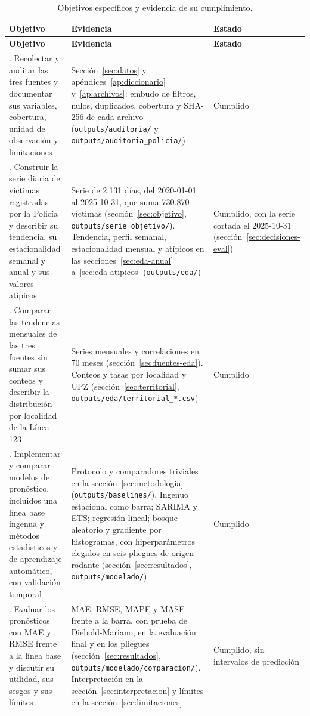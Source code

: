{\small
\setlength{\tabcolsep}{4pt}
\begin{longtable}{@{}>{\raggedright\arraybackslash}p{4.6cm}>{\raggedright\arraybackslash}p{7.6cm}>{\raggedright\arraybackslash}p{2.6cm}@{}}
\caption{Objetivos específicos y evidencia de su cumplimiento.}\label{tab:objetivos}\\
\toprule
\textbf{Objetivo} & \textbf{Evidencia} & \textbf{Estado} \\
\midrule
\endfirsthead
\toprule
\textbf{Objetivo} & \textbf{Evidencia} & \textbf{Estado} \\
\midrule
\endhead
\bottomrule
\endfoot
1. Recolectar y auditar las tres fuentes y documentar sus variables, cobertura, unidad de observación y limitaciones & Sección~\ref{sec:datos} y apéndices~\ref{ap:diccionario} y~\ref{ap:archivos}: embudo de filtros, nulos, duplicados, cobertura y SHA-256 de cada archivo (\texttt{outputs/\allowbreak{}auditoria/} y \texttt{outputs/\allowbreak{}auditoria\_\allowbreak{}policia/}) & Cumplido \\
\addlinespace
2. Construir la serie diaria de víctimas registradas por la Policía y describir su tendencia, su estacionalidad semanal y anual y sus valores atípicos & Serie de 2.131 días, del 2020-01-01 al 2025-10-31, que suma 730.870 víctimas (sección~\ref{sec:objetivo}, \texttt{outputs/\allowbreak{}serie\_\allowbreak{}objetivo/}). Tendencia, perfil semanal, estacionalidad mensual y atípicos en las secciones~\ref{sec:eda-anual} a~\ref{sec:eda-atipicos} (\texttt{outputs/eda/}) & Cumplido, con la serie cortada el 2025-10-31 (sección~\ref{sec:decisiones-eval}) \\
\addlinespace
3. Comparar las tendencias mensuales de las tres fuentes sin sumar sus conteos y describir la distribución por localidad de la Línea 123 & Series mensuales y correlaciones en 70 meses (sección~\ref{sec:fuentes-eda}). Conteos y tasas por localidad y UPZ (sección~\ref{sec:territorial}, \texttt{outputs/\allowbreak{}eda/\allowbreak{}territorial\_\allowbreak{}*.csv}) & Cumplido \\
\addlinespace
4. Implementar y comparar modelos de pronóstico, incluidos una línea base ingenua y métodos estadísticos y de aprendizaje automático, con validación temporal & Protocolo y comparadores triviales en la sección~\ref{sec:metodologia} (\texttt{outputs/baselines/}). Ingenuo estacional como barra; SARIMA y ETS; regresión lineal; bosque aleatorio y gradiente por histogramas, con hiperparámetros elegidos en seis pliegues de origen rodante (sección~\ref{sec:resultados}, \texttt{outputs/\allowbreak{}modelado/}) & Cumplido \\
\addlinespace
5. Evaluar los pronósticos con MAE y RMSE frente a la línea base y discutir su utilidad, sus sesgos y sus límites & MAE, RMSE, MAPE y MASE frente a la barra, con prueba de Diebold-Mariano, en la evaluación final y en los pliegues (sección~\ref{sec:resultados}, \texttt{outputs/\allowbreak{}modelado/\allowbreak{}comparacion/}). Interpretación en la sección~\ref{sec:interpretacion} y límites en la sección~\ref{sec:limitaciones} & Cumplido, sin intervalos de predicción \\
\end{longtable}
}

